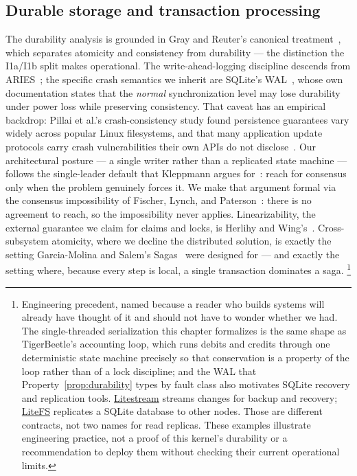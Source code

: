 \documentclass[11pt,a4paper]{article}
\theoremstyle{definition}
\theoremstyle{remark}
\begin{document}
\subsection{Durable storage and transaction processing}

The durability analysis is grounded in Gray and Reuter's canonical
treatment~, which separates atomicity and consistency from
durability --- the distinction the I1a/I1b split makes operational. The
write-ahead-logging discipline descends from ARIES~; the
specific crash semantics we inherit are SQLite's WAL~, whose own
documentation states that the \emph{normal} synchronization level may lose
durability under power loss while preserving consistency. That caveat has an
empirical backdrop: Pillai et al.'s crash-consistency study found persistence
guarantees vary widely across popular Linux filesystems, and that many
application update protocols carry crash vulnerabilities their own APIs do not
disclose~. Our architectural posture
--- a single writer rather than a replicated state machine --- follows the
single-leader default that Kleppmann argues for~: reach for
consensus only when the problem genuinely forces it. We make that argument formal
via the consensus impossibility of Fischer, Lynch, and
Paterson~: there is no agreement to reach, so the impossibility never
applies. Linearizability, the external guarantee we claim for claims and locks, is
Herlihy and Wing's~. Cross-subsystem atomicity, where we decline
the distributed solution, is exactly the setting Garcia-Molina and Salem's
Sagas~ were designed for --- and exactly the setting where,
because every step is local, a single transaction dominates a saga.%
\footnote{Engineering precedent, named because a reader who builds systems will
already have thought of it and should not have to wonder whether we had. The
single-threaded serialization this chapter formalizes is the same shape as
TigerBeetle's accounting loop, which runs debits and credits through one
deterministic state machine precisely so that conservation is a property of the
loop rather than of a lock discipline; and the WAL that
Property~\ref{prop:durability} types by fault class also motivates SQLite recovery
and replication tools. \href{https://litestream.io/}{Litestream} streams changes
for backup and recovery; \href{https://fly.io/docs/litefs/}{LiteFS} replicates a
SQLite database to other nodes. Those are different contracts, not two names for
read replicas. These examples illustrate engineering practice, not a proof of
this kernel's durability or a recommendation to deploy them without checking
their current operational limits.}
\end{document}
